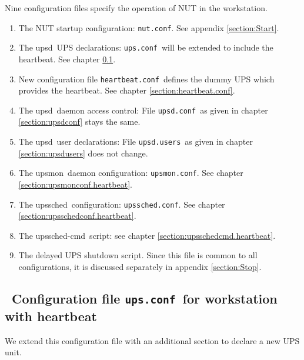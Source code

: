 \documentclass[12pt]{article}
\newlength{\headersep}\setlength{\headersep}{3mm}
\newcommand{\Hsep}{\hspace{\headersep}}
\newcommand{\newcolumn}{\vfill\eject}
\newcommand{\upsd}{\mbox{\textcolor{UPSDCOLOUR}{upsd}}}
\newcommand{\upsmon}{\mbox{\textcolor{MONCOLOUR}{upsmon}}}
\newcommand{\upssched}{\mbox{\textcolor{SCHEDCOLOUR}{upssched}}}
\newcommand{\upsschedcmd}{\mbox{\textcolor{CMDCOLOUR}{upssched-cmd}}}
\newcommand{\nutconf}{\textcolor{NUTCOLOUR}{\texttt{nut.conf}}}
\newcommand{\upsconf}{\textcolor{UPSDCOLOUR}{\texttt{ups.conf}}}
\newcommand{\heartbeatconf}{\textcolor{UPSDCOLOUR}{\texttt{heartbeat.conf}}}
\newcommand{\upsdconf}{\textcolor{UPSDCOLOUR}{\texttt{upsd.conf}}}
\newcommand{\upsdusers}{\textcolor{UPSDCOLOUR}{\texttt{upsd.users}}}
\newcommand{\upsmonconf}{\textcolor{MONCOLOUR}{\texttt{upsmon.conf}}}
\newcommand{\upsschedconf}{\textcolor{SCHEDCOLOUR}{\texttt{upssched.conf}}}
\newcommand{\ol}{\begin{enumerate}%
   \setlength{\itemsep}{0em}}
\newcommand{\eol}{\end{enumerate}}
\newcommand{\li}{\item}                 %
\newcommand{\Ref}[1]{\ref{#1}}
\begin{document}
Nine configuration files specify the operation of NUT in the workstation.

\ol

\li The NUT startup configuration: \nutconf.  See appendix
\Ref{section:Start}.

\li The \upsd\ UPS declarations: \upsconf\ will be extended to include
the heartbeat.  See chapter \ref{section:upsconf.heartbeat}.

\li New configuration file \heartbeatconf\ defines the dummy UPS which
provides the heartbeat.  See chapter \ref{section:heartbeat.conf}. 

\li The \upsd\ daemon access control: File \upsdconf\ as given
in chapter \ref{section:upsdconf} stays the same.

\li The \upsd\ user declarations: File \upsdusers\ as given in chapter
\ref{section:upsdusers} does not change.

\li The \upsmon\ daemon configuration: \upsmonconf.  See chapter
\ref{section:upsmonconf.heartbeat}.

\li The \upssched\ configuration: \upsschedconf.  See chapter
\ref{section:upsschedconf.heartbeat}.

\li The \upsschedcmd\ script: see chapter \ref{section:upsschedcmd.heartbeat}.

\li The delayed UPS shutdown script.  Since this file is common to all
configurations, it is discussed separately in appendix \ref{section:Stop}.

\eol


\subsection{\Hsep\ Configuration file \upsconf\ for workstation with heartbeat}\label{section:upsconf.heartbeat}

We extend this configuration file with an additional section to declare a new
UPS unit.
\end{document}

